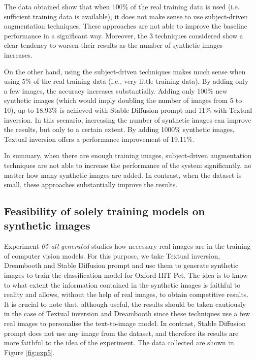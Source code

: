 The data obtained show that when 100\% of the real training data is used (i.e. sufficient training data is available), it does not make sense to use subject-driven augmentation techniques. These approaches are not able to improve the baseline performance in a significant way. Moreover, the 3 techniques considered show a clear tendency to worsen their results as the number of synthetic images increases. 

On the other hand, using the subject-driven techniques makes much sense when using 5\% of the real training data (i.e., very little training data). By adding only a few images, the accuracy increases substantially. Adding only 100\% new synthetic images (which would imply doubling the number of images from 5 to 10), up to 18.93\% is achieved with Stable Diffusion prompt and 11\% with Textual inversion. In this scenario, increasing the number of synthetic images can improve the results, but only to a certain extent. By adding 1000\% synthetic images, Textual inversion offers a performance improvement of 19.11\%.

In summary, when there are enough training images, subject-driven augmentation techniques are not able to increase the performance of the system significantly, no matter how many synthetic images are added. In contrast, when the dataset is small, these approaches substantially improve the results.

\subsection{Feasibility of solely training models on synthetic images} \label{sec: exp-05}

Experiment \textit{05-all-generated} studies how necessary real images are in the training of computer vision models. For this purpose, we take Textual inversion, Dreambooth and Stable Diffusion prompt and use them to generate synthetic images to train the classification model for Oxford-IIIT Pet. The idea is to know to what extent the information contained in the synthetic images is faithful to reality and allows, without the help of real images, to obtain competitive results. It is crucial to note that, although useful, the results should be taken cautiously in the case of Textual inversion and Dreambooth since these techniques use a few real images to personalise the text-to-image model. In contrast, Stable Diffusion prompt does not use any image from the dataset, and therefore its results are more faithful to the idea of the experiment. The data collected are shown in Figure \ref{fig:exp5}.

